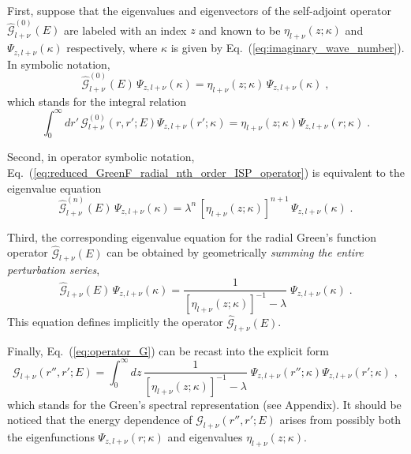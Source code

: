 \documentclass[a4paper,preprint,draft,showpacs,amsmath,amsfonts,amssymb,aps,prd]{revtex4}%
\begin{document}
First, suppose that the eigenvalues and eigenvectors
of the self-adjoint operator 
$\hat{\mathcal G}^{(0)}_{l+\nu} (E)$ are
labeled with an index $z$ and
known to be $\eta_{l+\nu}(z;\kappa)$ and
$\Psi_{z,l+\nu}(\kappa)$ respectively,
where $\kappa$ is given by Eq.~(\ref{eq:imaginary_wave_number}). 
In symbolic notation,
\begin{equation}
\hat{ {\mathcal G}}^{(0)}_{l+\nu} (E)
\,
\Psi_{z,l+\nu}(\kappa)
=
\eta_{l+\nu} (z;\kappa)
\,
\Psi_{z,l+\nu}(\kappa)
\;   ,
\label{eq:eigenvalue_problem_G_zero}
\end{equation} 
which stands for the integral relation
\begin{equation}
\int_{0}^{\infty}
  d r'  
\,
{\mathcal G}^{(0)}_{l+\nu} (r,r';E)
\Psi_{z,l+\nu} (r';\kappa)
=
\eta_{l+\nu}(z;\kappa)
\Psi_{z,l+\nu} (r;\kappa)
\;  .
\label{eq:eigenvalue_problem_G_zero_integral}
\end{equation}

Second, in operator symbolic notation,
Eq.~(\ref{eq:reduced_GreenF_radial_nth_order_ISP_operator})
is equivalent to the eigenvalue equation
\begin{equation}
\hat{ {\mathcal G}}^{(n)}_{l+\nu} (E)
\,
\Psi_{z,l+\nu}(\kappa)
=
\lambda^{n}
\, 
\left[ 
\eta_{l+\nu} (z;\kappa)
\right]^{n+1}
\,
\Psi_{z,l+\nu}(\kappa)
\;   .
\label{eq:reduced_GreenF_radial_nth_order_ISP_eigenvalue_eq}
\end{equation} 

Third,
the corresponding eigenvalue equation
for the radial Green's 
function operator 
$\hat{ {\mathcal G}}_{l+\nu} (E)$ 
can be obtained by geometrically 
{\em summing the entire perturbation series\/},
\begin{equation}
\hat{ {\mathcal G}}_{l+\nu} (E)
\,
\Psi_{z,l+\nu} (\kappa)
=
\frac{1}{  \left[ \eta_{l+\nu}(z;\kappa) \right]^{-1}
 -  \lambda}
\;
\Psi_{z,l+\nu} (\kappa)
\;   .
\label{eq:operator_G}
\end{equation} 
This equation defines implicitly 
the operator $\hat{ {\mathcal G}}_{l+\nu} (E)$.

Finally, 
Eq.~(\ref{eq:operator_G}) can be recast into 
the explicit form
\begin{equation}
{\mathcal G}_{l+\nu} (r'',r';E) 
=
\int_{0}^{\infty}  
dz
\,
\frac{1}{  \left[ \eta_{l+\nu}(z;\kappa) \right]^{-1}
 -  \lambda}
\;
\Psi_{z,l+\nu} (r'';\kappa) \Psi_{z,l+\nu} (r';\kappa)
\;  ,
\label{eq:GreenF_spectral_reps}
\end{equation} 
which stands for the Green's spectral representation
(see Appendix).
It should be noticed that 
the energy dependence of 
${\mathcal G}_{l+\nu} (r'',r';E) $
arises from possibly both
the eigenfunctions $\Psi_{z,l+\nu} (r;\kappa)$ and eigenvalues
$\eta_{l+\nu}(z;\kappa) $.
\end{document}
